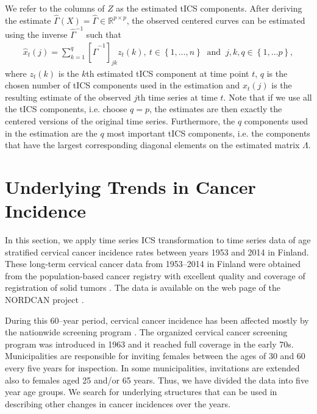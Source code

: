 \documentclass{llncs}
\begin{document}
We refer to the columns of $Z$ as the estimated tICS components. After deriving the estimate $\hat{\Gamma}\left(X\right) = \hat{\Gamma}\in \mathbb{R}^{p\times p}$,  the observed centered curves can be  estimated using the inverse $\hat{\Gamma}^{-1}$ such that
\begin{align}
\label{estimation}
\hat{x}_t\left(j\right)= \sum_{k=1}^q  \left[\hat{\Gamma}^{-1}\right]_{jk} z_t\left(k\right) , \ t\in \left\{1,\ldots, n\right\}  \ \text{ and  } \ j,k,q \in \left\{1,\ldots p\right\},
\end{align}
where $z_t\left(k\right)$ is the $k$th estimated tICS component at time point $t$, $q$ is the chosen number of tICS components used in the estimation and $\hat{x}_t\left(j\right)$ is the resulting estimate of the observed $j$th time series at  time $t$.  Note that if we use all the tICS components, i.e. choose $q=p$, the estimates are then exactly the centered versions of the original time series. Furthermore, the $q$ components used in the estimation are the $q$ most important tICS components, i.e. the components that have the largest corresponding diagonal elements on the estimated  matrix $\Lambda$. 


\section{Underlying Trends in Cancer Incidence}\label{data}
In this section, we apply time series ICS transformation to time series data of age stratified cervical cancer incidence rates between years 1953 and 2014 in Finland.
These long-term cervical cancer data from 1953--2014 in Finland were obtained from the population-based cancer registry with excellent quality and coverage of registration of solid tumors \cite{leinonen2016,teppo1994}. The data is available on  the web page of the NORDCAN project \cite{engholm2010}.

During this 60--year period, cervical cancer incidence has been affected mostly by the nationwide screening program \cite{hakama1975}. The organized cervical cancer screening program was introduced in 1963 and it reached full coverage in the early 70s. Municipalities are responsible for inviting females between the ages of 30 and 60 every five years for inspection. In some municipalities, invitations are extended also to females aged 25 and/or 65 years. Thus, we have divided the data into five year age groups.  We  search for underlying structures that can be used in describing other changes in cancer incidences over the years. 
 
\end{document}
